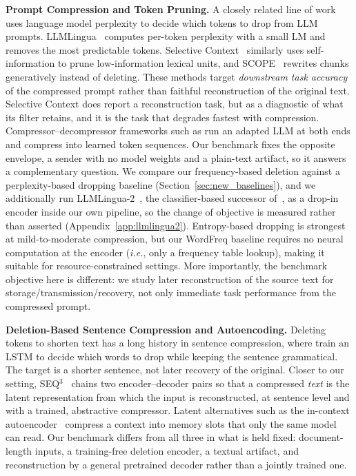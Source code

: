 \documentclass[11pt]{article}
\begin{document}
\textbf{Prompt Compression and Token Pruning.}
A closely related line of work uses language model perplexity
to decide which tokens to drop from LLM prompts.
LLMLingua~\citep{jiang2023llmlingua} computes per-token
perplexity with a small LM and removes the most predictable
tokens. Selective Context~\citep{li2023compressing} similarly
uses self-information to prune low-information lexical units, and
SCOPE~\citep{zhang2025scope} rewrites chunks generatively instead of
deleting. These methods target \emph{downstream task accuracy} of the
compressed prompt rather than faithful reconstruction of the original text. Selective Context does report a reconstruction task, but as a
diagnostic of what its filter retains, and it is the task that degrades
fastest with compression. Compressor--decompressor frameworks such as
\citet{li2026tokencompressor} run an adapted LLM at both ends and
compress into learned token sequences. Our benchmark fixes the
opposite envelope, a sender with no model weights and a plain-text
artifact, so it answers a complementary question. We compare our frequency-based deletion against a
perplexity-based dropping baseline (Section~\ref{sec:new_baselines}), and we
additionally run LLMLingua-2~\citep{pan2024llmlingua}, the classifier-based successor of~\citet{jiang2023llmlingua}, as a drop-in encoder inside our own
pipeline, so the change of objective is measured rather than asserted
(Appendix~\ref{app:llmlingua2}).  Entropy-based dropping
is strongest at mild-to-moderate compression, but our
WordFreq baseline requires no neural computation at the encoder
({\em i.e.}, only a frequency table lookup), making it suitable for
resource-constrained settings. More importantly, the benchmark
objective here is different: we study later reconstruction of the
source text for storage/transmission/recovery, not only immediate task performance from the compressed prompt.

\textbf{Deletion-Based Sentence Compression and Autoencoding.}
Deleting tokens to shorten text has a long history in sentence
compression, where \citet{filippova2015sentence} train an LSTM to
decide which words to drop while keeping the sentence grammatical. The target is a shorter sentence, not later recovery of the original. Closer
to our setting, SEQ$^3$~\citep{baziotis2019seq3} chains two
encoder--decoder pairs so that a compressed \emph{text} is the latent
representation from which the input is reconstructed, at sentence level
and with a trained, abstractive compressor. Latent alternatives such as
the in-context autoencoder~\citep{ge2024icae} compress a context into
memory slots that only the same model can read. Our benchmark differs
from all three in what is held fixed: document-length inputs, a
training-free deletion encoder, a textual artifact, and reconstruction
by a general pretrained decoder rather than a jointly trained one.
\end{document}

